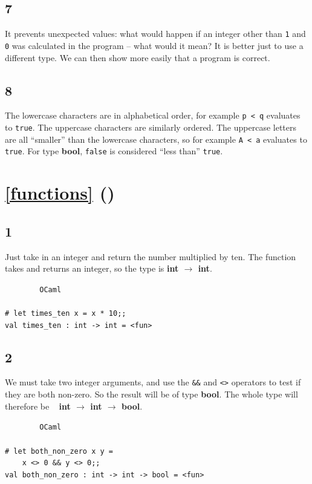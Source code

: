 \documentclass[]{book}
\newcommand\upquote[1]{\textquotesingle#1\textquotesingle}
\newcommand{\smspace}{\vspace{4mm}}
\begin{document}
\subsection*{7}
It prevents unexpected values: what would happen if an integer other than \texttt{1} and \texttt{0} was calculated in the program -- what would it mean? It is better just to use a different type. We can then show more easily that a program is correct.

\subsection*{8}

The lowercase characters are in alphabetical order, for example \texttt{\upquote{p}\! <\! \upquote{q}} evaluates to \texttt{true}. The uppercase characters are similarly ordered. The uppercase letters are all ``smaller'' than the lowercase characters, so for example \texttt{\upquote{A}\! <\! \upquote{a}} evaluates to \texttt{true}. For type \textrm{\textbf{bool}}, \texttt{false} is considered ``less than'' \texttt{true}.

\section*{\ref{functions} ()}
\subsection*{1}
Just take in an integer and return the number multiplied by ten. The function takes and returns an integer, so the type is \textbf{\textrm{int $\rightarrow$ int}}.

\smspace
\noindent\verb!        OCaml!\\
\noindent\\
\noindent\verb!# let times_ten x = x * 10;;!\\
\noindent\verb!val times_ten : int -> int = <fun>!

\subsection*{2}
We must take two integer arguments, and use the \texttt{\&\&} and \texttt{<>} operators to test if they are both non-zero. So the result will be of type \textrm{\textbf{bool}}. The whole type will therefore be \ \!\! \textbf{\textrm{int $\rightarrow$ int $\rightarrow$ bool}}.

\smspace
\noindent\verb!        OCaml!\\
\noindent\\
\noindent\verb!# let both_non_zero x y =!\\
\noindent\verb!    x <> 0 && y <> 0;;!\\
\noindent\verb!val both_non_zero : int -> int -> bool = <fun>!
\end{document}

